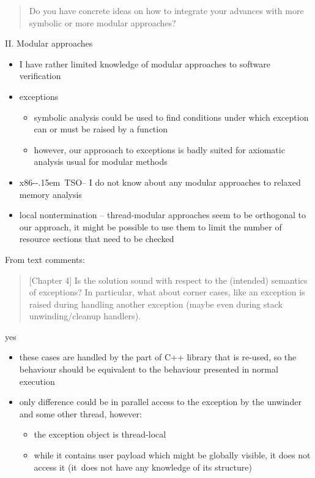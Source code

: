 \documentclass[aspectratio=169, fi]{paradise-slide}
\newcommand{\xtso}{\mbox{x86-\kern-.15em TSO}\xspace}
\newcommand{\rquote}[1]{\begin{quote}#1\end{quote}\bigskip\setlength{\leftmargini}{1em}}
\begin{document}
\begin{frame}[noframenumbering]{\qtitle}
  \rquote{Do you have concrete ideas on how to integrate your advances with more symbolic or more
    modular approaches?}

  \textrm{II.} Modular approaches
  \begin{itemize}
    \item I have rather limited knowledge of modular approaches to software verification
      \pause
    \item exceptions
      \begin{itemize}
        \item symbolic analysis could be used to find conditions under which exception can
          or must be raised by a function
        \item however, our approoach to exceptions is badly suited for axiomatic analysis usual for
          modular methods
      \end{itemize}
      \pause
    \item \xtso – I do not know about any modular approaches to relaxed memory analysis
      \pause
    \item local nontermination – thread-modular approaches seem to be orthogonal to our approach,
      it might be possible to use them to limit the number of resource sections that need to be
      checked
  \end{itemize}
\end{frame}

\begin{frame}[noframenumbering]{\qtitle}
  From text comments:
  \rquote{[Chapter 4] Is the solution sound with respect to the (intended) semantics of exceptions? In
    particular, what about corner cases, like an exception is raised during handling another
    exception (maybe even during stack unwinding/cleanup handlers).}

  yes
  \begin{itemize}
    \item these cases are handled by the part of C++ library that is re-used, so the behaviour
      should be equivalent to the behaviour presented in normal execution
    \item only difference could be in parallel access to the exception by the unwinder and some other
      thread, however:
      \begin{itemize}
        \item the exception object is thread-local
        \item while it contains user payload which might be globally visible, it does not access it
          (it~does not have any knowledge of its structure)
      \end{itemize}
  \end{itemize}
\end{frame}
\end{document}
